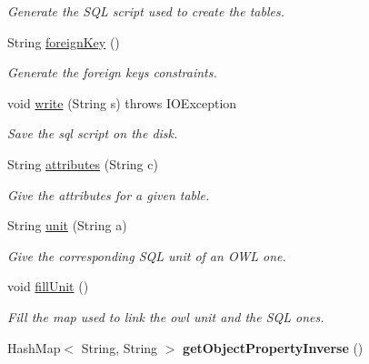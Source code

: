 \begin{DoxyCompactItemize}
\begin{DoxyCompactList}\small\item\em Generate the SQL script used to create the tables. \end{DoxyCompactList}\item 
String \hyperlink{class_data_base_1_1_tables_ac35eb49002e26a8066cee9d139512562}{foreignKey} ()
\begin{DoxyCompactList}\small\item\em Generate the foreign keys constraints. \end{DoxyCompactList}\item 
void \hyperlink{class_data_base_1_1_tables_ac3402b9a61ee3f4d40cb9eb4680213e0}{write} (String s)  throws IOException 
\begin{DoxyCompactList}\small\item\em Save the sql script on the disk. \end{DoxyCompactList}\item 
String \hyperlink{class_data_base_1_1_tables_a0cc659b39257e547f1c5857fe2ba9b0a}{attributes} (String c)
\begin{DoxyCompactList}\small\item\em Give the attributes for a given table. \end{DoxyCompactList}\item 
\hypertarget{class_data_base_1_1_tables_a15e4b8e12eb734a6b9397d6876672e44}{
String \hyperlink{class_data_base_1_1_tables_a15e4b8e12eb734a6b9397d6876672e44}{unit} (String a)}
\label{class_data_base_1_1_tables_a15e4b8e12eb734a6b9397d6876672e44}

\begin{DoxyCompactList}\small\item\em Give the corresponding SQL unit of an OWL one. \end{DoxyCompactList}\item 
\hypertarget{class_data_base_1_1_tables_a19aec04e79a4a0696a86a86ea5853856}{
void \hyperlink{class_data_base_1_1_tables_a19aec04e79a4a0696a86a86ea5853856}{fillUnit} ()}
\label{class_data_base_1_1_tables_a19aec04e79a4a0696a86a86ea5853856}

\begin{DoxyCompactList}\small\item\em Fill the map used to link the owl unit and the SQL ones. \end{DoxyCompactList}\item 
\hypertarget{class_data_base_1_1_tables_ae022cd96f6b78408704dcdfeb77c1ce4}{
HashMap$<$ String, String $>$ {\bfseries getObjectPropertyInverse} ()}
\label{class_data_base_1_1_tables_ae022cd96f6b78408704dcdfeb77c1ce4}


\end{DoxyCompactItemize}
